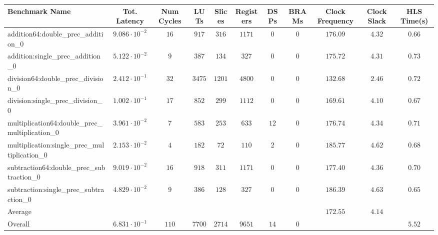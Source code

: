 \begin{tabular}{|l|c|c|c|c|c|c|c|c|c|c|}
\hline
Benchmark Name                                   & Tot. Latency            & Num Cycles & LUTs     & Slices   & Registers & DSPs   & BRAMs & Clock Frequency & Clock Slack & HLS Time(s) \\
\hline
addition64:double\_prec\_addition\_0             & $ 9.086 \cdot 10^{-2} $ & $ 16     $ & $ 917  $ & $ 316  $ & $ 1171  $ & $ 0  $ & $ 0 $ & $ 176.09      $ & $ 4.32    $ & $ 0.66    $ \\
addition:single\_prec\_addition\_0               & $ 5.122 \cdot 10^{-2} $ & $ 9      $ & $ 387  $ & $ 134  $ & $ 327   $ & $ 0  $ & $ 0 $ & $ 175.72      $ & $ 4.31    $ & $ 0.73    $ \\
division64:double\_prec\_division\_0             & $ 2.412 \cdot 10^{-1} $ & $ 32     $ & $ 3475 $ & $ 1201 $ & $ 4800  $ & $ 0  $ & $ 0 $ & $ 132.68      $ & $ 2.46    $ & $ 0.72    $ \\
division:single\_prec\_division\_0               & $ 1.002 \cdot 10^{-1} $ & $ 17     $ & $ 852  $ & $ 299  $ & $ 1112  $ & $ 0  $ & $ 0 $ & $ 169.61      $ & $ 4.10    $ & $ 0.67    $ \\
multiplication64:double\_prec\_multiplication\_0 & $ 3.961 \cdot 10^{-2} $ & $ 7      $ & $ 583  $ & $ 253  $ & $ 633   $ & $ 12 $ & $ 0 $ & $ 176.74      $ & $ 4.34    $ & $ 0.71    $ \\
multiplication:single\_prec\_multiplication\_0   & $ 2.153 \cdot 10^{-2} $ & $ 4      $ & $ 182  $ & $ 72   $ & $ 110   $ & $ 2  $ & $ 0 $ & $ 185.77      $ & $ 4.62    $ & $ 0.68    $ \\
subtraction64:double\_prec\_subtraction\_0       & $ 9.019 \cdot 10^{-2} $ & $ 16     $ & $ 918  $ & $ 311  $ & $ 1171  $ & $ 0  $ & $ 0 $ & $ 177.40      $ & $ 4.36    $ & $ 0.70    $ \\
subtraction:single\_prec\_subtraction\_0         & $ 4.829 \cdot 10^{-2} $ & $ 9      $ & $ 386  $ & $ 128  $ & $ 327   $ & $ 0  $ & $ 0 $ & $ 186.39      $ & $ 4.63    $ & $ 0.65    $ \\
\hline
Average                                          & $                     $ & $        $ & $      $ & $      $ & $       $ & $    $ & $   $ & $ 172.55      $ & $ 4.14    $ & $         $ \\
\hline
Overall                                          & $ 6.831 \cdot 10^{-1} $ & $ 110    $ & $ 7700 $ & $ 2714 $ & $ 9651  $ & $ 14 $ & $ 0 $ & $             $ & $         $ & $ 5.52    $ \\
\hline
\end{tabular}
